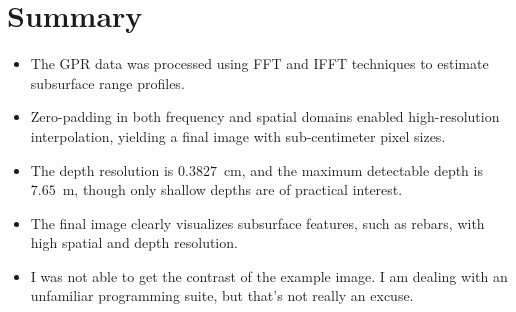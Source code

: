 \documentclass[12pt]{article}
\begin{document}
\section{Summary}
\begin{itemize}
    \item The GPR data was processed using FFT and IFFT techniques to estimate subsurface range profiles.
    \item Zero-padding in both frequency and spatial domains enabled high-resolution interpolation, yielding a final image with sub-centimeter pixel sizes.
    \item The depth resolution is $0.3827$~cm, and the maximum detectable depth is $7.65$~m, though only shallow depths are of practical interest.
    \item The final image clearly visualizes subsurface features, such as rebars, with high spatial and depth resolution.
    \item I was not able to get the contrast of the example image. I am dealing with an unfamiliar programming suite, but that's not really an excuse.
\end{itemize}
\end{document}
